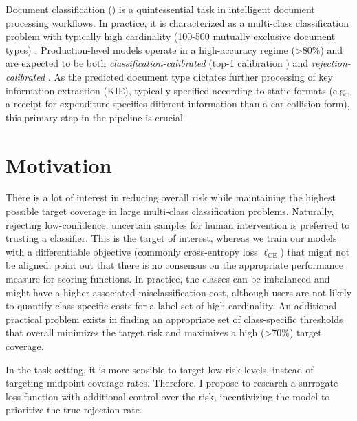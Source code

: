 Document classification (\DC) is a quintessential task in intelligent document processing workflows. In practice, it is characterized as a multi-class classification problem with typically high cardinality (100-500 mutually exclusive document types) \cite{vanlandeghem2023document}. Production-level \DC{} models operate in a high-accuracy regime (>80\%) and are expected to be both \textit{classification-calibrated} \cite[Definition 1]{ni2019calibration} (top-1 calibration \cite{naeini2015obtaining,guo2017calibration,vaicenavicius2019evaluating}) and \textit{rejection-calibrated} \cite[Definition 2]{ni2019calibration}. As the predicted document type dictates further processing of key information extraction (KIE), typically specified according to static formats (e.g., a receipt for expenditure specifies different information than a car collision form), this primary step in the pipeline is crucial. 


\section{Motivation}

There is a lot of interest in reducing overall risk while maintaining the highest possible target coverage in large multi-class classification problems. Naturally, rejecting low-confidence, uncertain samples for human intervention is preferred to trusting a classifier. 
This is the target of interest, whereas we train our models with a differentiable objective (commonly cross-entropy loss $\ell_{\mathrm{CE}}$) that might not be aligned. \cite{geifman2017selective,geifman2018bias} point out that there is no consensus on the appropriate performance measure for scoring functions.
In practice, the classes can be imbalanced and might have a higher associated misclassification cost, although users are not likely to quantify class-specific costs for a label set of high cardinality. %
An additional practical problem exists in finding an appropriate set of class-specific thresholds that overall minimizes the target risk and maximizes a high (>70\%) target coverage. 

In the \DC{} task setting, it is more sensible to target low-risk levels, instead of targeting midpoint coverage rates. Therefore, I propose to research a surrogate loss function with additional control over the risk, incentivizing the model to prioritize the true rejection rate. 

